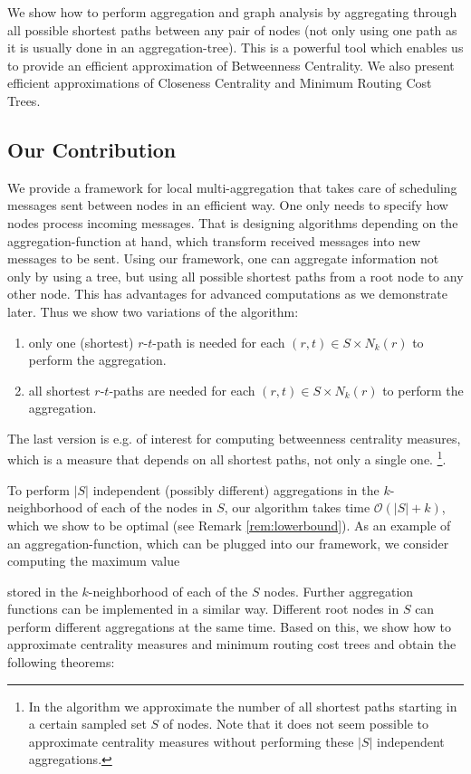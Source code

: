 \documentclass[11pt]{article}
\newcommand{\BO}{\mathcal{O}}
\newcommand{\todoI}[1]{}\newcommand{\blueI}[1]{}
\begin{document}
We show how to perform aggregation and graph analysis by aggregating through all possible shortest paths between any pair of nodes (not only using one path as it is usually done in an aggregation-tree). This is a powerful tool which enables us to provide an efficient approximation of Betweenness Centrality. We also present efficient approximations of Closeness Centrality and Minimum Routing Cost Trees. 


\subsection{Our Contribution}
We provide a framework for local multi-aggregation that takes care of scheduling messages sent between nodes in an efficient way. One only needs to specify how nodes process incoming messages. That is designing algorithms depending on the aggregation-function at hand, which transform received messages into new messages to be sent. Using our framework, one can aggregate information not only by using a tree, but using all possible shortest paths from a root node to any other node. This has advantages for advanced computations as we demonstrate later. Thus we show two variations of the algorithm:
\begin{enumerate}
\item only one (shortest) $r$-$t$-path is needed for each $(r,t)\in S\times N_k(r)$ to perform the aggregation.
\item all shortest $r$-$t$-paths are needed for each $(r,t)\in S\times N_k(r)$ to perform the aggregation.
\end{enumerate}
The last version is e.g. of interest for computing betweenness centrality measures, which is a measure that depends on all shortest paths, not only a single one. \footnote{In the algorithm we approximate the number of all shortest paths starting in a certain sampled set $S$ of nodes. Note that it does not seem possible to approximate centrality measures without performing these $|S|$ independent aggregations.}. 

To perform $|S|$ independent (possibly different) aggregations in the $k$-neighborhood of each of the nodes in $S$, our algorithm takes time $\BO(|S|+k)$, which we show to be optimal (see Remark \ref{rem:lowerbound}). As an example of an aggregation-function, which can be plugged into our framework, we consider computing the maximum value
\todoI{more fkt.}
stored in the $k$-neighborhood of each of the $S$ nodes. Further aggregation functions can be implemented in a similar way. Different root nodes in $S$ can perform different aggregations at the same time. Based on this, we show how to approximate centrality measures and minimum routing cost trees and obtain the following theorems:
\end{document}
